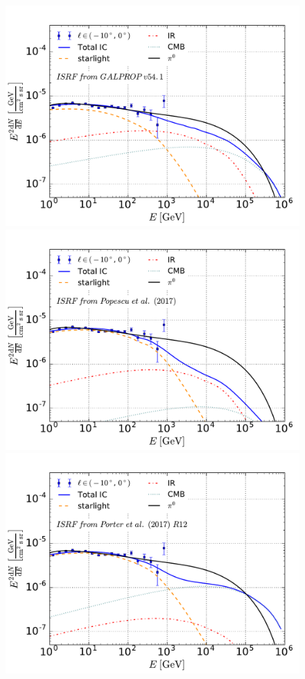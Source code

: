 \begin{figure}[h]
\centering
\includegraphics[width=\twopic\textwidth]{plots/SED_ISRF_componentsboxes_source_0_v54}
\includegraphics[width=\twopic\textwidth]{plots/SED_ISRF_componentsboxes_source_0_Popescu}
\includegraphics[width=\twopic\textwidth]{plots/SED_ISRF_componentsboxes_source_0_R12}

\end{figure}

